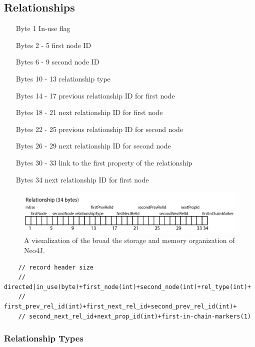 \documentclass[a4paper,10pt]{article}
\begin{document}
    \subsection{Relationships}
    \begin{enumerate}
     \item[Byte 1] In-use flag 
     \item[Bytes 2 - 5] first node ID 
     \item[Bytes 6 - 9] second node ID 
     \item[Bytes 10 - 13] relationship type 
     \item[Bytes 14 - 17] previous relationship ID for first node
     \item[Bytes 18 - 21] next relationship ID for first node
     \item[Bytes 22 - 25] previous relationship ID for second node
     \item[Bytes 26 - 29] next relationship ID for second node
     \item[Bytes 30 - 33] link to the first property of the relationship
     \item[Bytes 34] next relationship ID for first node
    \end{enumerate}

    \begin{figure}[htp]\label{rel_layout}
 \begin{center}
  \includegraphics[keepaspectratio,width=\textwidth]{img/relationship_layout.png}
 \end{center}
 \caption{A visualization of the broad the storage and memory organization of Neo4J.} %
\end{figure}
    
    \begin{verbatim}
    // record header size
    // directed|in_use(byte)+first_node(int)+second_node(int)+rel_type(int)+
    // first_prev_rel_id(int)+first_next_rel_id+second_prev_rel_id(int)+
    // second_next_rel_id+next_prop_id(int)+first-in-chain-markers(1)
    \end{verbatim}
    
        \subsubsection{Relationship Types}
\end{document}
